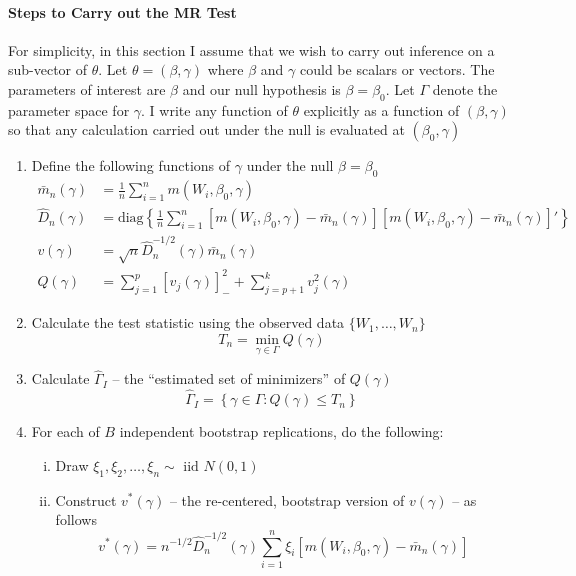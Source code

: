 \documentclass[12pt]{article}
\begin{document}
\paragraph{Steps to Carry out the MR Test}
For simplicity, in this section I assume that we wish to carry out inference on a sub-vector of $\theta$.
Let $\theta = (\beta, \gamma)$ where $\beta$ and $\gamma$ could be scalars or vectors.
The parameters of interest are $\beta$ and our null hypothesis is $\beta = \beta_0$.
Let $\Gamma$ denote the parameter space for $\gamma$.
I write any function of $\theta$ explicitly as a function of $(\beta, \gamma)$ so that any calculation carried out under the null is evaluated at $(\beta_0, \gamma)$
\begin{enumerate}
  \item Define the following functions of $\gamma$ under the null $\beta = \beta_0$
    \begin{align*}
      \bar{m}_n(\gamma) &= \frac{1}{n} \sum_{i=1}^n m(W_i,\beta_0,\gamma) \\
      \widehat{D}_n(\gamma) &= \mbox{diag}\left\{ \frac{1}{n} \sum_{i=1}^{n} \left[ m(W_i,\beta_0, \gamma) - \bar{m}_n(\gamma) \right]\left[ m(W_i,\beta_0, \gamma) - \bar{m}_n(\gamma) \right]'\right\} \\
      v(\gamma) &= \sqrt{n} \widehat{D}^{-1/2}_n(\gamma)\bar{m}_n(\gamma) \\
      Q(\gamma) &=  \sum_{j=1}^p \left[ v_j(\gamma) \right]^2_{-} + \sum_{j=p+1}^k v_j^2(\gamma) 
    \end{align*}
  \item Calculate the test statistic using the observed data $\{W_1, \hdots, W_n\}$
    \[
      T_n = \min_{\gamma \in \Gamma} Q(\gamma) 
    \]
  \item Calculate $\widehat{\Gamma}_I$ -- the ``estimated set of minimizers'' of $Q(\gamma)$ 
    \[
      \widehat{\Gamma}_I = \left\{\gamma \in \Gamma \colon Q(\gamma) \leq T_n \right\} 
    \]
  \item For each of $B$ independent bootstrap replications, do the following:
    \begin{enumerate}[(i)]
      \item Draw $\xi_1, \xi_2, \hdots, \xi_n \sim \mbox{ iid } N(0,1)$
      \item Construct $v^*(\gamma)$ -- the re-centered, bootstrap version  of $v(\gamma)$ -- as follows
        \[
          v^*(\gamma) = n^{-1/2} \widehat{D}_n^{-1/2}(\gamma) \sum_{i=1}^n \xi_i \left[ m(W_i, \beta_0, \gamma) - \bar{m}_n(\gamma) \right]
        \]
    \end{enumerate}
\end{enumerate}
\end{document}
